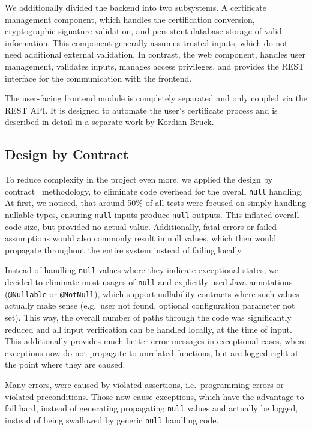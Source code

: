 We additionally divided the backend into two subsystems.
A certificate management component, which handles the certification conversion, cryptographic signature validation, and
persistent database storage of valid information.
This component generally assumes trusted inputs, which do not need additional external validation.
In contrast, the web component, handles user management, validates inputs, manages access privileges, and provides the
REST interface for the communication with the frontend.

The user-facing frontend module is completely separated and only coupled via the REST API\@.
It is designed to automate the user's certificate process and is described in detail in a separate work by Kordian
Bruck.

\subsection*{Design by Contract}
To reduce complexity in the project even more, we applied the design by contract~\cite{meyer1992applying} methodology,
to eliminate code overhead for the overall \lstinline{null} handling.
At first, we noticed, that around 50\% of all tests were focused on simply handling nullable types, ensuring
\lstinline{null} inputs produce \lstinline{null} outputs.
This inflated overall code size, but provided no actual value.
Additionally, fatal errors or failed assumptions would also commonly result in null values, which then would propagate
throughout the entire system instead of failing locally.

Instead of handling \lstinline{null} values where they indicate exceptional states, we decided to eliminate most usages
of \lstinline{null} and explicitly used Java annotations (\lstinline{@Nullable} or \lstinline{@NotNull}), which support
nullability contracts where such values actually make sense (e.g.\ user not found, optional configuration parameter not
set).
This way, the overall number of paths through the code was significantly reduced and all input verification can be
handled locally, at the time of input.
This additionally provides much better error messages in exceptional cases, where exceptions now do not propagate to
unrelated functions, but are logged right at the point where they are caused.

Many errors, were caused by violated assertions, i.e.\ programming errors or violated preconditions.
Those now cause exceptions, which have the advantage to fail hard, instead of generating propagating \lstinline{null}
values and actually be logged,
instead of being swallowed by generic \lstinline{null} handling code.

